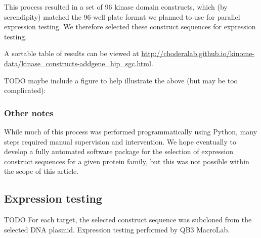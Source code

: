 \documentclass[aps,pre,twocolumn,nofootinbib,superscriptaddress,linenumbers]{revtex4-1}
\begin{document}
This process resulted in a set of 96 kinase domain constructs, which (by serendipity) matched the 96-well plate format we planned to use for parallel expression testing.
We therefore selected these construct sequences for expression testing.

A sortable table of results can be viewed at \url{http://choderalab.github.io/kinome-data/kinase\_constructs-addgene\_hip\_sgc.html}.

{
\color{blue}
TODO maybe include a figure to help illustrate the above (but may be too complicated):
}

\subsubsection{Other notes}

While much of this process was performed programmatically using Python, many steps required manual supervision and intervention.
We hope eventually to develop a fully automated software package for the selection of expression construct sequences for a given protein family, but this was not possible within the scope of this article.

\subsection{Expression testing}

{\color{blue} TODO}
For each target, the selected construct sequence was subcloned from the selected DNA plasmid.
Expression testing performed by QB3 MacroLab.
\end{document}
